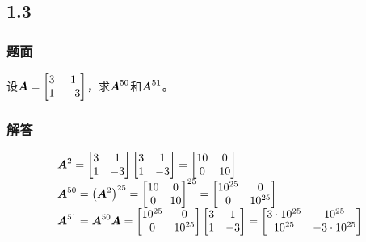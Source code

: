 \documentclass{beamer}
\begin{document}
\subsection*{1.3}

\begin{frame}
\frametitle{题面}

设\(\boldsymbol{A}=\begin{bmatrix}3&1\\1&-3\end{bmatrix}\)，求\(\boldsymbol{A}^{50}\)和\(\boldsymbol{A}^{51}\)。

\end{frame}

\begin{frame}
\frametitle{解答}

    \begin{equation*}
        \begin{array}{lll}
            \boldsymbol{A}^2=\begin{bmatrix}3&1\\1&-3\end{bmatrix}\begin{bmatrix}3&1\\1&-3\end{bmatrix}=\begin{bmatrix}10&0\\0&10\end{bmatrix}      \\
            \boldsymbol{A}^{50}=\left( \boldsymbol{A}^2 \right)^{25}={\begin{bmatrix}10&0\\0&10\end{bmatrix}}^{25}=\begin{bmatrix}10^{25}&0\\0&10^{25}\end{bmatrix} \\
            \boldsymbol{A}^{51}=\boldsymbol{A}^{50}\boldsymbol{A}=\begin{bmatrix}10^{25}&0\\0&10^{25}\end{bmatrix}\begin{bmatrix}3&1\\1&-3\end{bmatrix}=\begin{bmatrix}3\cdot10^{25}&10^{25}\\10^{25}&-3\cdot10^{25}\end{bmatrix}
        \end{array}
    \end{equation*}

\end{frame}
\end{document}
